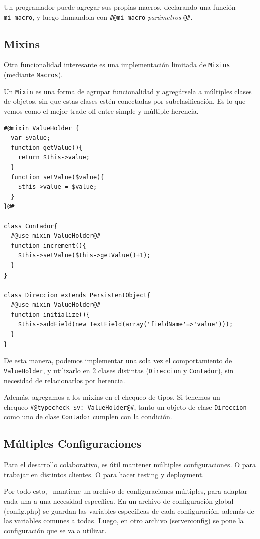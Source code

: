 Un programador puede agregar sus propias macros, declarando una función \verb"mi_macro", y luego llamandola con \verb"#@mi_macro" {\it parámetros} \verb"@#".

\subsection{Mixins}
\label{sub-mixins}
Otra funcionalidad interesante es una implementación limitada de \verb"Mixins" (mediante \verb"Macros").

Un \verb"Mixin" es una forma de agrupar funcionalidad y agregársela a múltiples clases de objetos, sin que estas clases estén conectadas por subclasificación. Es lo que vemos como el mejor trade-off entre simple y múltiple herencia.

\begin{verbatim}
#@mixin ValueHolder {
  var $value;
  function getValue(){
    return $this->value;
  }
  function setValue($value){
    $this->value = $value;
  }
}@#

class Contador{
  #@use_mixin ValueHolder@#
  function increment(){
    $this->setValue($this->getValue()+1);
  }
}

class Direccion extends PersistentObject{
  #@use_mixin ValueHolder@#
  function initialize(){
    $this->addField(new TextField(array('fieldName'=>'value')));
  }
}

\end{verbatim}

De esta manera, podemos implementar una sola vez el comportamiento de \verb'ValueHolder', y utilizarlo en 2 clases distintas (\verb"Direccion" y \verb"Contador"), sin necesidad de relacionarlos por herencia.

Además, agregamos a los mixins en el chequeo de tipos. Si tenemos un \\ chequeo \verb"#@typecheck $v: ValueHolder@#", tanto un objeto de clase \verb"Direccion" como uno de clase \verb"Contador" cumplen con la condición.

\subsection{Múltiples Configuraciones}

Para el desarrollo colaborativo, es útil mantener múltiples configuraciones. O para trabajar en distintos clientes. O para hacer testing y deployment.

Por todo esto, \PWB \ mantiene un archivo de configuraciones múltiples, para adaptar cada una a una necesidad específica. En un archivo de configuración global (config.php) se guardan las variables específicas de cada configuración, además de las variables comunes a todas. Luego, en otro archivo (serverconfig) se pone la configuración que se va a utilizar.

